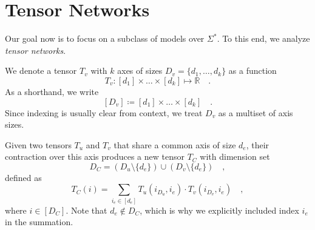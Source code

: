 \documentclass[../../main.tex]{subfiles}
\begin{document}
\section{Tensor Networks}
    Our goal now is to focus on a subclass of models over $\Sigma^*$. To this end, we analyze \emph{tensor networks}.

    \bigskip
    We denote a tensor \( T_v \) with \( k \) axes of sizes \( D_v = \{d_1, \dots, d_k\} \) as a function
    \[
    T_v : [d_1] \times \dots \times [d_k] \mapsto \mathbb{R} \quad .
    \]
    As a shorthand, we write
    \[
        [D_v] \coloneqq [d_1] \times \dots \times [d_k] \quad .
    \]
    Since indexing is usually clear from context, we treat \( D_v \) as a multiset of axis sizes.

    Given two tensors \( T_u \) and \( T_v \) that share a common axis of size \( d_e \), their contraction over this axis produces a new tensor \( T_C \) with dimension set
    \[
    D_C = (D_u \setminus \{d_e\}) \cup (D_v \setminus \{d_e\}) \quad ,
    \]
    defined as
    \[
    T_C(i) = \sum_{i_e \in [d_e]} T_u(i_{D_u}, i_{e}) \cdot T_v(i_{D_v}, i_{e}) \quad ,
    \]
    where \( i \in [D_C] \). Note that $d_e \not \in D_C$, which is why we explicitly included index $i_{e}$ in the summation.
\end{document}
